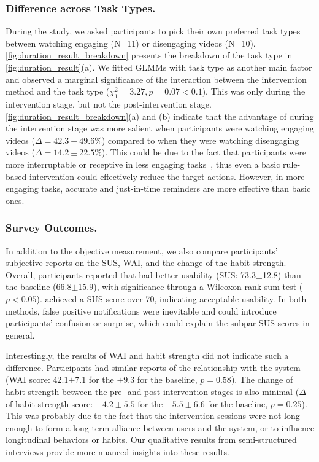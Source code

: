 \subsubsection{Difference across Task Types.}
During the study, we asked participants to pick their own preferred task types between watching engaging (N=11) or disengaging videos (N=10).
\autoref{fig:duration_result_breakdown} presents the breakdown of the task type in \autoref{fig:duration_result}(a).
We fitted GLMMs with task type as another main factor and observed a marginal significance of the interaction between the intervention method and the task type ($\chi^2_1=3.27, p=0.07<0.1$). This was only during the intervention stage, but not the post-intervention stage.
\autoref{fig:duration_result_breakdown}(a) and (b) indicate that the advantage of \projectname during the intervention stage was more salient when participants were watching engaging videos ($\Delta=42.3\pm49.6\%$) compared to when they were watching disengaging videos ($\Delta=14.2\pm22.5\%$).
This could be due to the fact that participants were more interruptable or receptive in less engaging tasks~\cite{pielot2017beyond,mishra_detecting_2021,choi_multi-stage_2019}, thus even a basic rule-based intervention could effectively reduce the target actions. However, in more engaging tasks, accurate and just-in-time reminders are more effective than basic ones.



\subsubsection{Survey Outcomes.}
In addition to the objective measurement, we also compare participants' subjective reports on the SUS, WAI, and the change of the habit strength.
Overall, participants reported that \projectname had better usability (SUS: 73.3$\pm$12.8) than the baseline (66.8$\pm$15.9), with significance through a Wilcoxon rank sum test ($p<0.05$).
\projectname achieved a SUS score over 70, indicating acceptable usability. In both methods, false positive notifications were inevitable and could introduce participants' confusion or surprise, which could explain the subpar SUS scores in general.

Interestingly, the results of WAI and habit strength did not indicate such a difference. Participants had similar reports of the relationship with the system (WAI score: 42.1$\pm$7.1 for the \projectname {}$\pm$9.3 for the baseline, $p=0.58$).
The change of habit strength between the pre- and post-intervention stages is also minimal ($\Delta$ of habit strength score: $-4.2\pm5.5$ for the \projectname \vs $-5.5\pm6.6$ for the baseline, $p=0.25$).
This was probably due to the fact that the intervention sessions were not long enough to form a long-term alliance between users and the system, or to influence longitudinal behaviors or habits.
Our qualitative results from semi-structured interviews provide more nuanced insights into these results.


